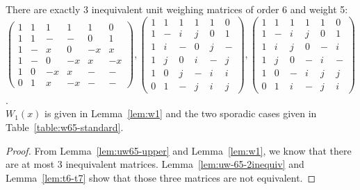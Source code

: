 \begin{theorem} \label{th:main-uw65}
 There are exactly 3 inequivalent unit weighing matrices of order 6 and weight 5:
\\               $\left(\begin{array}{rrrrrr}
                1 &  1 &  1 &  1 &  1 &  0 \\
                1 &  1 &  - &  - &  0 &  1 \\
                1 &  - &  x &  0 & -x &  x \\
                1 &  - &  0 & -x &  x & -x \\
                1 &  0 & -x &  x &  - &  - \\
                0 &  1 &  x & -x &  - &  -
              \end{array}\right),
                \left(\begin{array}{rrrrrr}
                1 &  1 &  1 &  1 &  1 &  0 \\
                1 &  - &  i &  j &  0 &  1 \\
                1 &  i &  - &  0 &  j &  - \\
                1 &  j &  0 &  i &  - &  j \\
                1 &  0 &  j &  - &  i &  i \\
                0 &  1 &  - &  j &  i &  j
              \end{array}\right),
                \left(\begin{array}{rrrrrr}
                1 &  1 &  1 &  1 &  1 &  0 \\
                1 &  - &  i &  j &  0 &  1 \\
                1 &  i &  j &  0 &  - &  i \\
                1 &  j &  0 &  - &  i &  - \\
                1 &  0 &  - &  i &  j &  j \\
                0 &  1 &  i &  - &  j &  i
              \end{array}\right)$. \\
$W_1(x)$ is given in Lemma~\ref{lem:w1} and the two sporadic cases given in Table~\ref{table:w65-standard}.
 \begin{proof}
  From Lemma~\ref{lem:uw65-upper} and Lemma~\ref{lem:w1}, we know that there are at most 3 inequivalent matrices. Lemma~\ref{lem:uw-65-2inequiv} and Lemma~\ref{lem:t6-t7} show that those three matrices are not equivalent.
 \end{proof}

\end{theorem}

